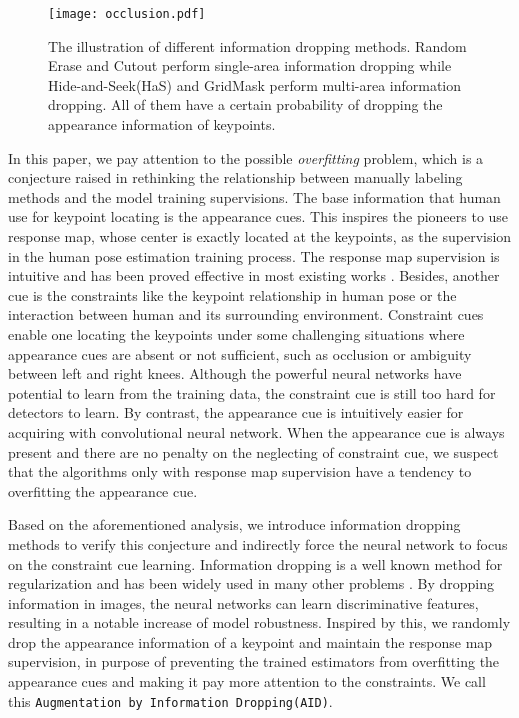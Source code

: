 \documentclass[final]{cvpr}
\begin{document}
\begin{figure*}[t]
	\setlength{\abovecaptionskip}{0.cm}
    \begin{center}
        \texttt{[image: occlusion.pdf]}
    \end{center}
   \caption{The illustration of different information dropping methods. Random Erase and Cutout perform single-area information dropping while Hide-and-Seek(HaS) and GridMask perform multi-area information dropping. All of them have a certain probability of dropping the appearance information of keypoints.}
    \label{fig:occlusion}
\end{figure*}

In this paper, we pay attention to the possible \textit{overfitting} problem, which is a conjecture raised in rethinking the relationship between manually labeling methods and the model training supervisions. The base information that human use for keypoint locating is the appearance cues. This inspires the pioneers to use response map, whose center is exactly located at the keypoints, as the supervision in the human pose estimation training process. The response map supervision is intuitive and has been proved effective in most existing works \cite{SBNet,HRNet,MSPN,RSN,DARK,UDP,Higher}. Besides, another cue is the constraints like the keypoint relationship in human pose or the interaction between human and its surrounding environment. Constraint cues enable one locating the keypoints under some challenging situations where appearance cues are absent or not sufficient, such as occlusion or ambiguity between left and right knees. Although the powerful neural networks have potential to learn from the training data, the constraint cue is still too hard for detectors to learn. By contrast, the appearance cue is intuitively easier for acquiring with convolutional neural network. When the appearance cue is always present and there are no penalty on the neglecting of constraint cue, we suspect that the algorithms only with response map supervision have a tendency to overfitting the appearance cue.

Based on the aforementioned analysis, we introduce information dropping methods to verify this conjecture and indirectly force the neural network to focus on the constraint cue learning. Information dropping is a well known method for regularization and has been widely used in many other problems \cite{BTforREID,IDforFR,SENet,IDforDET,REDA,Cutout,HaS}. By dropping information in images, the neural networks can learn discriminative features, resulting in a notable increase of model robustness. Inspired by this, we randomly drop the appearance information of a keypoint and maintain the response map supervision, in purpose of preventing the trained estimators from overfitting the appearance cues and making it pay more attention to the constraints. We call this \texttt{Augmentation by Information Dropping(AID)}.
\end{document}
